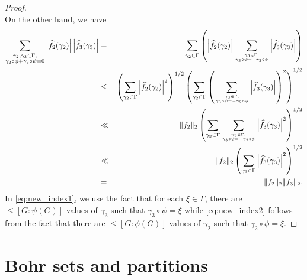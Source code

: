 \documentclass[10pt]{article}
\theoremstyle{definition}
\begin{document}
\begin{proof}
\begin{equation*}
\end{equation*}
On the other hand, we have
\begin{eqnarray}
\sum_{\substack{\gamma_2, \gamma_3 \in \Gamma, \\ \gamma_2 \circ \phi + \gamma_3 \circ \psi = 0}} \left| \widehat{f_2}(\gamma_2) \right| \left| \widehat{f_3}(\gamma_3) \right| &=& \sum_{\gamma_2 \in \Gamma} \left( \left| \widehat{f_2}(\gamma_2) \right| \sum_{\gamma_3 \in \Gamma, \atop{\gamma_3 \circ \psi = - \gamma_2 \circ \phi}} \left| \widehat{f_3}(\gamma_3) \right|\right) \nonumber\\
&\leq& \left( \sum_{\gamma_2 \in \Gamma} \left| \widehat{f_2}(\gamma_2) \right|^2 \right)^{1/2} \left( \sum_{\gamma_2 \in \Gamma} \left( \sum_{\gamma_3 \in \Gamma, \atop{\gamma_3 \circ \psi = - \gamma_2 \circ \phi}} \left| \widehat{f_3}(\gamma_3) \right| \right)^2 \right)^{1/2} \nonumber \\
&\ll& \lVert f_2 \rVert_2 \left( \sum_{\gamma_2 \in \Gamma} \sum_{\gamma_3 \in \Gamma,\atop{\gamma_3 \circ \psi = - \gamma_2 \circ \phi}} \left|  \widehat{f_3}(\gamma_3) \right|^2 \right)^{1/2} \label{eq:new_index1} \\
&\ll& \lVert f_2 \rVert_2 \left( \sum_{\gamma_3 \in \Gamma} \left| \widehat{f_3}(\gamma_3) \right|^2 \right)^{1/2} \label{eq:new_index2} \\
&=& \lVert f_2 \rVert_2 \lVert f_3 \rVert_2. \nonumber
\end{eqnarray}
In \eqref{eq:new_index1}, we use the fact that for each $\xi \in \Gamma$, there are $\leq [G: \psi(G)]$ values of $\gamma_3$ such that $\gamma_3 \circ \psi = \xi$ while \eqref{eq:new_index2} follows from the fact that there are $\leq [G: \phi(G)]$ values of $\gamma_2$ such that $\gamma_2 \circ \phi = \xi$.
\end{proof}

\section{Bohr sets and partitions}
\label{sec:partition}
\end{document}
